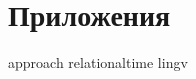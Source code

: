 \section{Приложения}


\renewcommand{\thetitlemod}{
    \ifnum\value{page}>1
        \textcolor{zblue}
            {$\insertframenumber \text{ из }
            \inserttotalframenumber$~|~Приложение к <<Элементам поиска нечетких дубликатов видео>>}
    \else
    \fi
}

    {approach}
    {relationaltime}
    {lingv}
